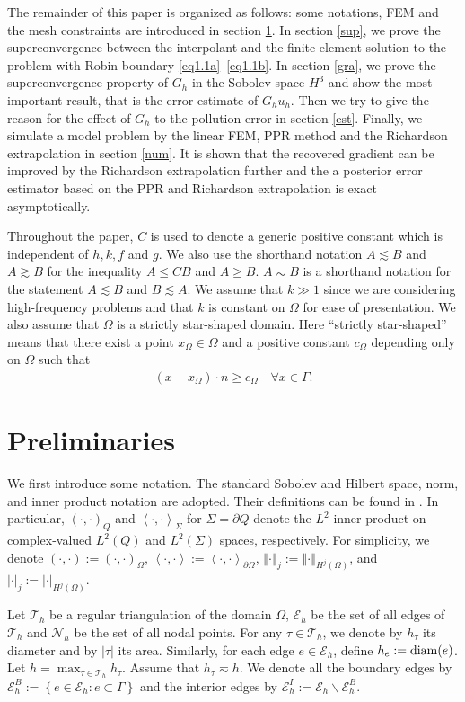 \documentclass[leqno,final]{siamltex}
\numberwithin{equation}{section}
\newcommand{\norm}[1]{\left\Vert#1\right\Vert}
\newcommand{\abs}[1]{\left\vert#1\right\vert}
\newcommand{\pd}[1]{\left\langle #1\right\rangle}
\newcommand{\set}[1]{\left\{#1\right\}}
\newcommand{\ls}{\lesssim}
\newcommand{\Ga}{\Gamma}
\newcommand{\Om}{\Omega}
\newcommand{\pa}{\partial}
\newcommand{\N}{\mathcal{N}}
\newcommand{\T}{\mathcal{T}}
\newcommand{\E}{\mathcal{E}}
\newcommand{\eqn}[1]{\begin{align*}#1\end{align*}}
\begin{document}
The remainder of this paper is organized as follows: some notations, FEM and the mesh constraints are
introduced in section \ref{pre}. In section \ref{sup}, we prove the superconvergence between the interpolant and
the finite element solution to the problem with Robin boundary \eqref{eq1.1a}--\eqref{eq1.1b}. In section \ref{gra},
we prove the superconvergence property of $G_h$ in the Sobolev space $H^3$ and show the most important result,
that is the error estimate of $G_hu_h$. Then we try to give the reason for the effect of $G_h$ to the pollution error in
section \ref{est}. Finally, we simulate a model problem by the linear FEM, PPR method and the Richardson extrapolation in section \ref{num}.
It is shown that the recovered gradient can be improved by the Richardson extrapolation further and the a posterior error estimator based on the PPR
and Richardson extrapolation is exact asymptotically.

Throughout the paper, $C$ is used to denote a generic positive constant which is
independent of $h, k, f$ and $g$. We also use the shorthand
notation $A\ls B$ and $A\gtrsim B$ for the inequality $A\leq CB$ and $A\geq B$.
$A\eqsim B$ is a shorthand notation for the statement $A\ls B$ and $B\ls A$.
We assume that $k\gg1$ since we are considering high-frequency problems and that $k$ is constant
on $\Om$ for ease of presentation. We also assume that $\Om$ is a strictly star-shaped domain.
Here ``strictly star-shaped'' means that there exist a point $x_\Om\in\Om$ and a positive
constant $c_\Om$ depending only on $\Om$ such that
\eqn{ (x-x_\Om)\cdot n\geq c_\Om\quad \forall x\in\Ga. }

\section{Preliminaries} \label{pre}
We first introduce some notation. The standard Sobolev and Hilbert space, norm, and inner product notation
are adopted. Their definitions can be found in \cite{bs08,ciarlet78}. In particular, $(\cdot,\cdot)_Q$ and $\pd{\cdot,\cdot}_\Sigma$
for $\Sigma=\pa Q$ denote the $L^2$-inner product on complex-valued $L^2(Q)$ and $L^2(\Sigma)$ spaces, respectively.
For simplicity, we denote $(\cdot,\cdot):=(\cdot,\cdot)_\Om$, $\pd{\cdot,\cdot}:=\pd{\cdot,\cdot}_{\pa\Om}$,
$\norm{\cdot}_j:=\norm{\cdot}_{H^j(\Om)}$, and $\abs{\cdot}_j:=\abs{\cdot}_{H^j(\Om)}$.

Let $\T_h$ be a regular triangulation of the domain $\Om$, $\E_h$ be the set of all edges of $\T_h$ and
$\N_h$ be the set of all nodal points. For any $\tau\in\T_h$, we denote by $h_\tau$ its diameter and by $\abs{\tau}$ its area.
Similarly, for each edge $e\in\E_h$, define $h_e:={\rm diam}(e)$. Let $h=\max_{\tau\in\T_h}h_\tau$. Assume that $h_\tau\eqsim h$.
We denote all the boundary edges by $\E_h^B:=\set{e\in\E_h:e\subset\Ga}$ and the interior edges by
$\E_h^I:=\E_h\backslash\E_h^B$.
\end{document}
